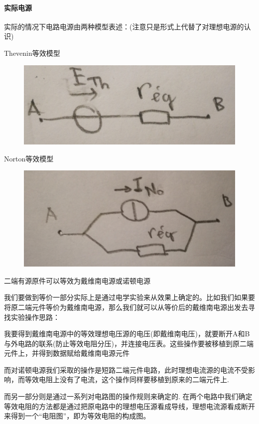 \documentclass[12pt]{book}
\theoremstyle{definition}\newtheorem{dfn}{Définition}[chapter]
\theoremstyle{plain}\newtheorem{thm}{Théorème}[chapter]
\theoremstyle{plain}\newtheorem{prp}{Proposition}[chapter]
\theoremstyle{plain}\newtheorem{lem}{\bf Lemme}[chapter]
\theoremstyle{plain}\newtheorem{axm}{\bf Axiome}[chapter]
\theoremstyle{plain}\newtheorem{lmm}{\bf Lemme}[chapter]
\theoremstyle{plain}\newtheorem{cor}{\bf Corollaire}[chapter]
\theoremstyle{remark}\newtheorem{rem}{Remarque}[chapter]
\begin{document}
\paragraph{实际电源}实际的情况下电路电源由两种模型表述：(注意只是形式上代替了对理想电源的认识)

Thevenin等效模型
\begin{figure}[H]
	\centering
	\includegraphics[scale=0.1]{Electrocinetique cadre et concepts de base//1}
\end{figure}
Norton等效模型
\begin{figure}[H]
	\centering
	\includegraphics[scale=0.1]{Electrocinetique cadre et concepts de base//2}
\end{figure}


{\color{red} 二端有源原件可以等效为戴维南电源或诺顿电源} 

我们要做到等价一部分实际上是通过电学实验来从效果上确定的。比如我们如果要将原二端元件等价为戴维南电源，那么我们就可以从等价后的戴维南电源出发去寻找实验操作思路：

我要得到戴维南电源中的等效理想电压源的电压(即戴维南电压)，就要断开A和B与外电路的联系(防止等效电阻分压)，并连接电压表。这些操作要被移植到原二端元件上，并得到数据赋给戴维南电源元件

而对诺顿电源我们采取的操作是短路二端元件电路，此时理想电流源的电流不受影响，而等效电阻上没有了电流，这个操作同样要移植到原来的二端元件上.

而另一部分则是通过一系列对电路图的操作规则来确定的.%
在两个电路中我们确定等效电阻的方法都是通过把原电路中的理想电压源看成导线，理想电流源看成断开来得到一个“电阻图”，即为等效电阻的构成图。
\end{document}

